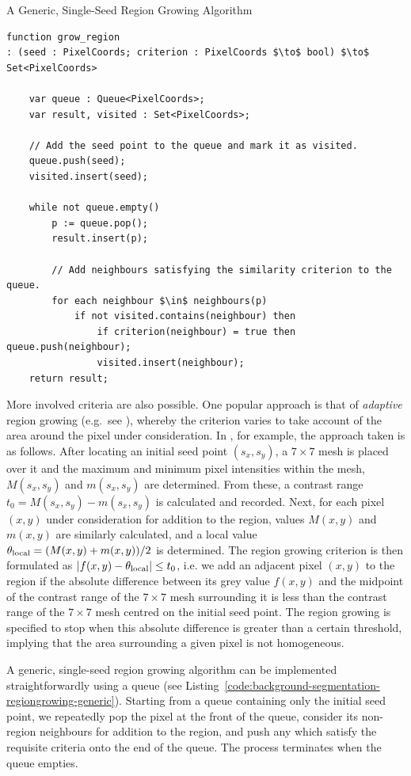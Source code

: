\begin{stulisting}[p]
\caption{A Generic, Single-Seed Region Growing Algorithm}
\label{code:background-segmentation-regiongrowing-generic}
\begin{lstlisting}[style=Default]
function grow_region
: (seed : PixelCoords; criterion : PixelCoords $\to$ bool) $\to$ Set<PixelCoords>

	var queue : Queue<PixelCoords>;
	var result, visited : Set<PixelCoords>;

	// Add the seed point to the queue and mark it as visited.
	queue.push(seed);
	visited.insert(seed);

	while not queue.empty()
		p := queue.pop();
		result.insert(p);

		// Add neighbours satisfying the similarity criterion to the queue.
		for each neighbour $\in$ neighbours(p)
			if not visited.contains(neighbour) then
				if criterion(neighbour) = true then queue.push(neighbour);
				visited.insert(neighbour);
	return result;
\end{lstlisting}
\end{stulisting}

More involved criteria are also possible. One popular approach is that of \emph{adaptive} region growing (e.g.~see \cite{lin06,pohle01}), whereby the criterion varies to take account of the area around the pixel under consideration. In \cite{lin06}, for example, the approach taken is as follows. After locating an initial seed point $(s_x, s_y)$, a $7 \times 7$ mesh is placed over it and the maximum and minimum pixel intensities within the mesh, $M(s_x, s_y)$ and $m(s_x, s_y)$ are determined. From these, a contrast range $t_0 = M(s_x, s_y) - m(s_x, s_y)$ is calculated and recorded. Next, for each pixel $(x,y)$ under consideration for addition to the region, values $M(x,y)$ and $m(x,y)$ are similarly calculated, and a local value $\theta_{\rm local} = (M(x,y) + m(x,y)) / 2$ is determined. The region growing criterion is then formulated as $|f(x,y) - \theta_{\rm local}| \le t_0$, i.e. we add an adjacent pixel $(x,y)$ to the region if the absolute difference between its grey value $f(x,y)$ and the midpoint of the contrast range of the $7 \times 7$ mesh surrounding it is less than the contrast range of the $7 \times 7$ mesh centred on the initial seed point. The region growing is specified to stop when this absolute difference is greater than a certain threshold, implying that the area surrounding a given pixel is not homogeneous.

A generic, single-seed region growing algorithm can be implemented straightforwardly using a queue (see Listing~\ref{code:background-segmentation-regiongrowing-generic}). Starting from a queue containing only the initial seed point, we repeatedly pop the pixel at the front of the queue, consider its non-region neighbours for addition to the region, and push any which satisfy the requisite criteria onto the end of the queue. The process terminates when the queue empties.

